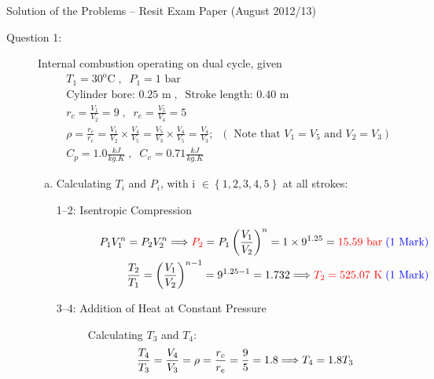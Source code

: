 \documentclass[12pt,twoside]{report}
\newcommand{\frc}{\displaystyle\frac}
\begin{document}
\setcounter{page}{1}

\vfill

\pagebreak


\begin{center}
{\Large Solution of the Problems -- Resit Exam Paper (August 2012/13)}
\end{center}


\begin{description}

\item [Question 1:] Internal combustion operating on dual cycle, given
\begin{eqnarray}
&& T_{1}= 30^{\text{o}}\text{C}\;,\;\;P_{1}=1\text{ bar} \nonumber \\
&& \text{Cylinder bore: } 0.25 \text{ m}\;,\;\;\text{Stroke length: } 0.40 \text{ m} \nonumber \\
&& r_{c}=\frc{V_{1}}{V_{2}}=9\;,\;\; r_{e}=\frc{V_{5}}{V_{4}}=5 \nonumber \\
&& \rho=\frc{r_{c}}{r_{e}}=\frc{V_{1}}{V_{2}}\times\frc{V_{4}}{V_{5}}=\frc{V_{5}}{V_{3}}\times\frc{V_{4}}{V_{5}}=\frc{V_{4}}{V_{3}}; \;\;\left(\text{ Note that }V_{1}=V_{5}\text{ and }V_{2}=V_{3}\right) \nonumber \\
&& C_{p}=1.0 \frc{kJ}{kg.K}\;, \;\; C_{v}=0.71\frc{kJ}{kg.K} \nonumber
\end{eqnarray}

\begin{enumerate}[(a)]
\item Calculating $T_{i}$ and $P_{i}$, with i $\in\left\{1,2,3,4,5\right\}$ at all strokes:
\begin{description}

\item [1--2: Isentropic Compression]
\begin{eqnarray}
&& P_{1}V_{1}^{n}=P_{2}V_{2}^{n} \Longrightarrow \textcolor{red}{P_{2}} = P_{1}\left(\frc{V_{1}}{V_{2}}\right)^{n}=1\times 9^{1.25}=\textcolor{red}{15.59\text{ bar}}\; \textcolor{blue}{\text{(1 Mark)}}\nonumber \\
&& \frc{T_{2}}{T_{1}}=\left(\frc{V_{1}}{V_{2}}\right)^{n-1}= 9^{1.25-1} =1.732 \Longrightarrow \textcolor{red}{T_{2}=525.07\text{ K}} \;\textcolor{blue}{\text{(1 Mark)}} \nonumber
\end{eqnarray}

\item [3--4: Addition of Heat at Constant Pressure]
Calculating $T_{3}$ and $T_{4}$:
\begin{displaymath}
\frc{T_{4}}{T_{3}}=\frc{V_{4}}{V_{3}}=\rho=\frc{r_{c}}{r_{e}}=\frc{9}{5}=1.8 \Longrightarrow T_{4}=1.8 T_{3} \nonumber \\
\end{displaymath} 


\end{description}
\end{enumerate}
\end{description}
\end{document}
